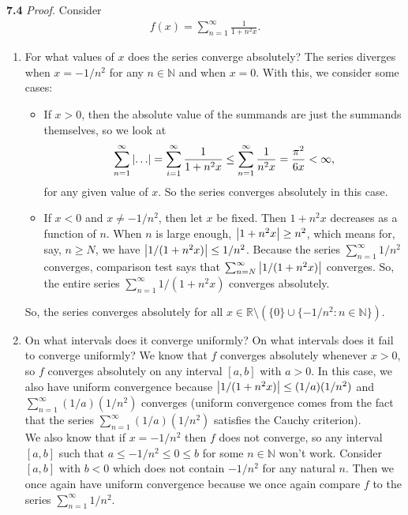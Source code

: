 \documentclass[11pt]{article}
\begin{document}
\noindent \textbf{7.4}
\noindent \textit{Proof.} Consider 
\begin{align*}
f(x) = \sum^\infty_{n=1}\frac{1}{1+n^2x}.
\end{align*}
\begin{enumerate}
	\item For what values of $x$ does the series converge absolutely? The series diverges when $x=-1/n^2$ for any $n\in \mathbb{N}$ and when $x=0$. With this, we consider some cases:
	\begin{itemize}
		\item If $x>0$, then the absolute value of the summands are just the summands themselves, so we look at 
		\begin{align*}
		\sum^\infty_{n=1}\abs{\dots} = \sum^\infty_{i=1}{\frac{1}{1+n^2x}} \leq \sum^\infty_{n=1}{\frac{1}{n^2x}} = \frac{\pi^2}{6x} < \infty,
		\end{align*} 
		for any given value of $x$. So the series converges absolutely in this case. 
		
		\item If $x<0$ and $x\neq -1/n^2$, then let $x$ be fixed. Then $1+n^2x$ decreases as a function of $n$. When $n$ is large enough, $\abs{1+n^2x} \geq n^2$, which means for, say, $n \geq N$, we have $\abs{1/(1+n^2x)} \leq 1/n^2$. Because the series $\sum^\infty_{n=1}1/n^2$ converges, comparison test says that $\sum^\infty_{n=N} \abs{1/(1+n^2x)}$ converges. So, the entire series $\sum^\infty_{n=1}1/(1+n^2x)$ converges absolutely.
	\end{itemize} 
	So, the series converges absolutely for all $x\in \mathbb{R}\setminus (\{0\} \cup \{-1/n^2: n\in \mathbb{N}\})$.
	
	
	\item On what intervals does it converge uniformly? On what intervals does it fail to converge uniformly? We know that $f$ converges absolutely whenever $x>0$, so $f$ converges absolutely on any interval $[a,b]$ with $a>0$. In this case, we also have uniform convergence because $\abs{1/(1+n^2x)} \leq (1/a)(1/n^2)$ and $\sum^\infty_{n=1}(1/a)(1/n^2)$ converges (uniform convergence comes from the fact that the series $\sum^\infty_{n=1}(1/a)(1/n^2)$ satisfies the Cauchy criterion).\\

	We also know that if $x=-1/n^2$ then $f$ does not converge, so any interval $[a,b]$ such that $a\leq -1/n^2 \leq 0 \leq b$ for some $n\in \mathbb{N}$ won't work. Consider $[a,b]$ with $b<0$ which does not contain $-1/n^2$ for any natural $n$. Then we once again have uniform convergence because we once again compare $f$ to the series $\sum^\infty_{n=1}1/n^2$. 
	

\end{enumerate}
\end{document}
